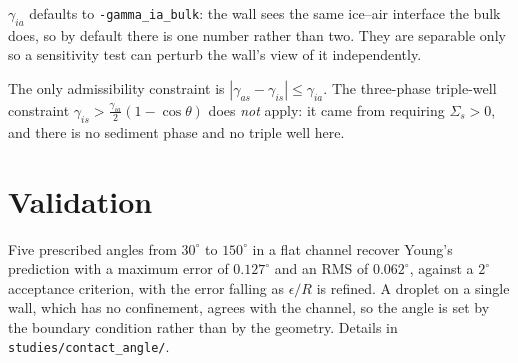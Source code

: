 \documentclass[11pt,a4paper]{article}
\newcommand{\code}[1]{\texttt{\small #1}}
\newcommand{\sia}{\gamma_{ia}}
\newcommand{\sis}{\gamma_{is}}
\newcommand{\sas}{\gamma_{as}}
\newcommand{\eps}{\epsilon}
\begin{document}
$\sia$ defaults to \code{-gamma\_ia\_bulk}: the wall sees the same ice--air
interface the bulk does, so by default there is one number rather than two. They
are separable only so a sensitivity test can perturb the wall's view of it
independently.

The only admissibility constraint is $|\sas-\sis|\le\sia$. The three-phase
triple-well constraint $\sis>\tfrac{\sia}{2}(1-\cos\theta)$ does \emph{not}
apply: it came from requiring $\Sigma_s>0$, and there is no sediment phase and no
triple well here.

\section{Validation}

Five prescribed angles from $30^\circ$ to $150^\circ$ in a flat channel recover
Young's prediction with a maximum error of $0.127^\circ$ and an RMS of
$0.062^\circ$, against a $2^\circ$ acceptance criterion, with the error falling
as $\eps/R$ is refined. A droplet on a single wall, which has no confinement,
agrees with the channel, so the angle is set by the boundary condition rather
than by the geometry. Details in
\code{studies/contact\_angle/}.
\end{document}
